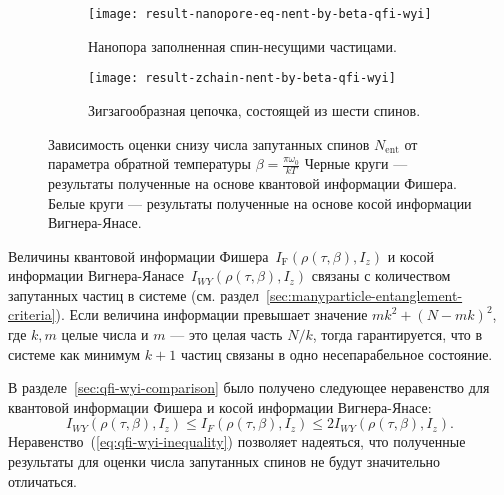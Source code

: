 \begin{figure}[H]
  \centering
  \begin{subfigure}[t]{0.49\textwidth}
    \texttt{[image: result-nanopore-eq-nent-by-beta-qfi-wyi]}
	\caption{
		Нанопора заполненная спин-несущими частицами.
	}
	\label{fig:result-nanopore-eq-nent-by-beta-qfi-wyi}
  \end{subfigure}
  \hfill
  \begin{subfigure}[t]{0.49\textwidth}
    \texttt{[image: result-zchain-nent-by-beta-qfi-wyi]}
	\caption{
		Зигзагообразная цепочка, состоящей из шести спинов.
	}
	\label{fig:result-zchain-nent-by-beta-qfi-wyi}
  \end{subfigure}
  \caption{
    Зависимость оценки снизу числа запутанных спинов  $N_\mathrm{ent}$
	от параметра обратной температуры $\beta = \frac{\pi \omega_0}{kT}$
	Черные круги --- результаты полученные на основе квантовой информации Фишера.
	Белые круги --- результаты полученные на основе косой информации Вигнера-Янасе.
  }
  \label{fig:result-nent-by-beta-qfi-wyi}
\end{figure}

Величины квантовой информации Фишера~$I_\mathrm{F}(\rho(\tau,\beta),I_z)$ и косой информации Вигнера-Яанасе~$I_{WY}(\rho(\tau,\beta),I_z)$
связаны с количеством запутанных частиц в системе (см. раздел~\ref{sec:manyparticle-entanglement-criteria}).
Если величина информации превышает значение $mk^2 + (N - mk)^2$,
где $k, m$ целые числа и $m$ --- это целая часть $N/k$,
тогда гарантируется,
что в системе как минимум $k+1$ частиц связаны в одно несепарабельное состояние.

В разделе~\ref{sec:qfi-wyi-comparison} было получено следующее неравенство
для квантовой информации Фишера и косой информации Вигнера-Янасе:
%
\begin{equation} \label{eq:qfi-wyi-inequality}
    I_{WY}\left(\rho(\tau,\beta), I_z\right)
    \leq I_F\left(\rho(\tau,\beta), I_z\right)
    \leq 2I_{WY}\left(\rho(\tau,\beta), I_z\right).
\end{equation}
%
Неравенство~(\ref{eq:qfi-wyi-inequality}) позволяет надеяться,
что полученные результаты для оценки числа запутанных спинов не будут значительно отличаться.

